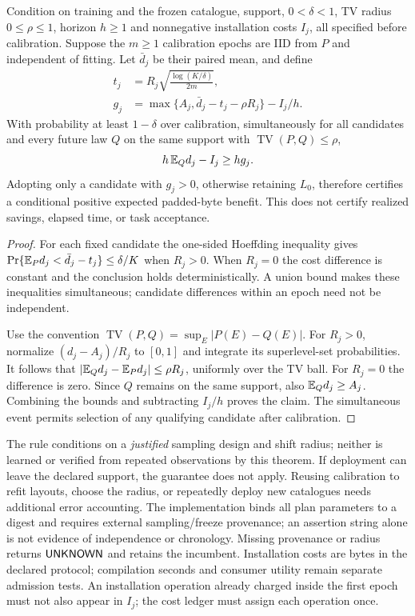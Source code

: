 \begin{theorem}\label{thm:adoption}
Condition on training and the frozen catalogue, support, $0<\delta<1$,
TV radius $0\le\rho\le1$, horizon $h\ge1$ and nonnegative installation
costs $I_j$, all specified before calibration. Suppose the $m\ge1$
calibration epochs are IID from $P$ and independent of fitting. Let
$\bar d_j$ be their paired mean, and define
\begin{align}
 t_j&=R_j\sqrt{\frac{\log(K/\delta)}{2m}},\nonumber\\
 g_j&=\max\{A_j,\bar d_j-t_j-\rho R_j\}-I_j/h.
 \label{eq:adoption-lower}
\end{align}
With probability at least $1-\delta$ over calibration, simultaneously
for all candidates and every future law $Q$ on the same support with
$\operatorname{TV}(P,Q)\le\rho$,
\[
 h\,\mathbb E_Qd_j-I_j\ge h g_j.
\]
Adopting only a candidate with $g_j>0$, otherwise retaining $L_0$,
therefore certifies a conditional positive expected padded-byte benefit.
This does not certify realized savings, elapsed time, or task acceptance.
\end{theorem}
\begin{proof}
For each fixed candidate the one-sided Hoeffding inequality gives
$\Pr\{\mathbb E_Pd_j<\bar d_j-t_j\}\le\delta/K$ when $R_j>0$.
When $R_j=0$ the cost difference is constant and the conclusion holds
deterministically. A union bound makes these inequalities simultaneous;
candidate differences within an epoch need not be independent.

Use the convention $\operatorname{TV}(P,Q)=\sup_E|P(E)-Q(E)|$.
For $R_j>0$, normalize $(d_j-A_j)/R_j$ to $[0,1]$ and integrate
its superlevel-set probabilities. It follows that
$|\mathbb E_Qd_j-\mathbb E_Pd_j|\le\rho R_j$, uniformly over the TV ball.
For $R_j=0$ the difference is zero. Since $Q$ remains on the same
support, also $\mathbb E_Qd_j\ge A_j$. Combining the bounds and subtracting
$I_j/h$ proves the claim. The simultaneous event permits selection of
any qualifying candidate after calibration.
\end{proof}

The rule conditions on a \emph{justified} sampling design and shift radius;
neither is learned or verified from repeated observations by this theorem.
If deployment can leave the declared support, the guarantee does not apply.
Reusing calibration to refit layouts, choose the radius, or repeatedly
deploy new catalogues needs additional error accounting. The implementation
binds all plan parameters to a digest and requires external sampling/freeze
provenance; an assertion string alone is not evidence of independence or
chronology. Missing provenance or radius returns $\mathsf{UNKNOWN}$ and retains
the incumbent. Installation costs are bytes in the declared protocol;
compilation seconds and consumer utility remain separate admission tests.
An installation operation already charged inside the first epoch must not
also appear in $I_j$; the cost ledger must assign each operation once.
